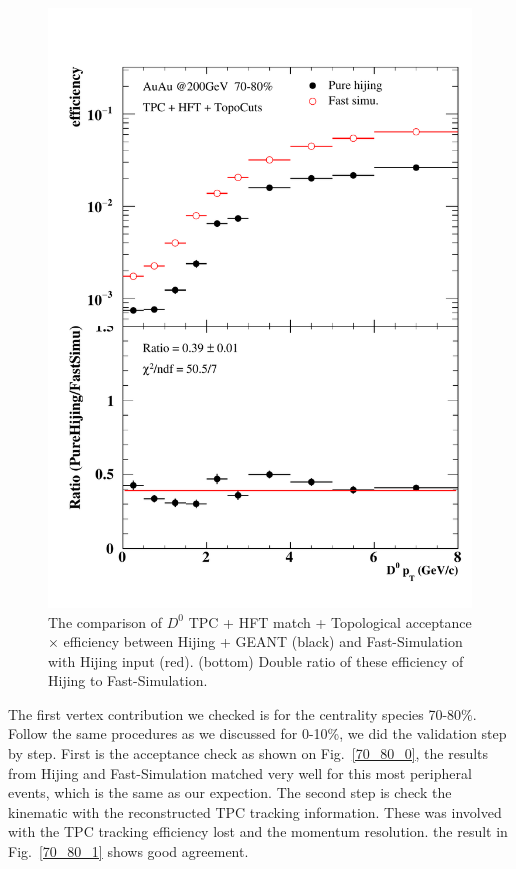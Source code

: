 \begin{figure}[htbp]
\begin{minipage}[htbp]{0.47\linewidth}
\includegraphics[width=1.0\textwidth,angle=0]{figure/Run14_D0HFT/70_80.pdf} 
\caption{ The comparison of $D^0$ TPC + HFT match + Topological acceptance $\times$ efficiency between Hijing + GEANT (black) and Fast-Simulation with Hijing input (red). (bottom) Double ratio of these efficiency of Hijing to Fast-Simulation.\label{70_80_3}}
\end{minipage}
\end{figure}

The first vertex contribution we checked is for the centrality species 70-80\%. Follow the same procedures as we discussed for 0-10\%, we did the validation step by step. First is the acceptance check as shown on Fig.~\ref{70_80_0}, the results from Hijing and Fast-Simulation matched very well for this most peripheral events, which is the same as our expection. The second step is check the kinematic with the reconstructed TPC tracking information. These was involved with the TPC tracking efficiency lost and the momentum resolution. the result in Fig.~\ref{70_80_1} shows good agreement.

